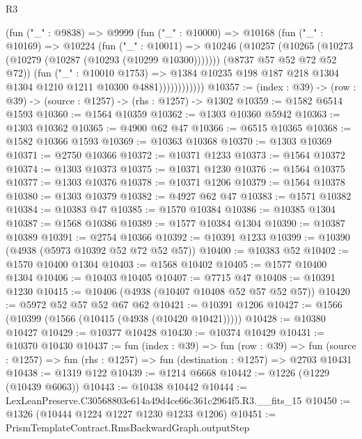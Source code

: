 \begin{lexlean}{R3}
\begin{coremodule}
                    (fun ("_" : @9838) =>
                    @9999
                      (fun ("_" : @10000) =>
                      @10168
                        (fun ("_" : @10169) =>
                        @10224
                          (fun ("_" : @10011) =>
                          @10246
                            (@10257 (@10265 (@10273 (@10279 (@10287 (@10293 (@10299 @10300)))))))
                            (@8737 @57 @52 @72 @52 @72))
                          (fun ("_" : @10010 @1753) =>
                          @1384
                            @10235
                            @198
                            @187
                            @218
                            @1304
                            @1304
                            @1210
                            @1211
                            @10300
                            @4881))))))))))))
@10357 := (index : @39) -> (row : @39) -> (source : @1257) -> (rhs : @1257) -> @1302
@10359 := @1582 @6514 @1593
@10360 := @1564 @10359
@10362 := @1303 @10360 @5942
@10363 := @1303 @10362
@10365 := @4900 @62 @47
@10366 := @6515 @10365
@10368 := @1582 @10366 @1593
@10369 := @10363 @10368
@10370 := @1303 @10369
@10371 := @2750 @10366
@10372 := @10371 @1233
@10373 := @1564 @10372
@10374 := @1303 @10373
@10375 := @10371 @1230
@10376 := @1564 @10375
@10377 := @1303 @10376
@10378 := @10371 @1206
@10379 := @1564 @10378
@10380 := @1303 @10379
@10382 := @4927 @62 @47
@10383 := @1571 @10382
@10384 := @10383 @47
@10385 := @1570 @10384
@10386 := @10385 @1304
@10387 := @1568 @10386
@10389 := @1577 @10384 @1304
@10390 := @10387 @10389
@10391 := @2754 @10366
@10392 := @10391 @1233
@10399 := @10390 (@4938 (@5973 @10392 @52 @72 @52 @57))
@10400 := @10383 @52
@10402 := @1570 @10400 @1304
@10403 := @1568 @10402
@10405 := @1577 @10400 @1304
@10406 := @10403 @10405
@10407 := @7715 @47
@10408 := @10391 @1230
@10415 := @10406 (@4938 (@10407 @10408 @52 @57 @52 @57))
@10420 := @5972 @52 @57 @52 @67 @62
@10421 := @10391 @1206
@10427 := @1566 (@10399 (@1566 (@10415 (@4938 (@10420 @10421)))))
@10428 := @10380 @10427
@10429 := @10377 @10428
@10430 := @10374 @10429
@10431 := @10370 @10430
@10437 := fun (index : @39) =>
  fun (row : @39) =>
  fun (source : @1257) => fun (rhs : @1257) => fun (destination : @1257) => @2703 @10431
@10438 := @1319 @122
@10439 := @1214 @6668
@10442 := @1226 (@1229 (@10439 @6063))
@10443 := @10438 @10442
@10444 := LexLeanPreserve.C30568803e614a49d4ce66c361c2964f5.R3.__fits_15
@10450 := @1326 (@10444 @1224 @1227 @1230 @1233 @1206)
@10451 := PrismTemplateContract.RmsBackwardGraph.outputStep

\end{coremodule}
\end{lexlean}
